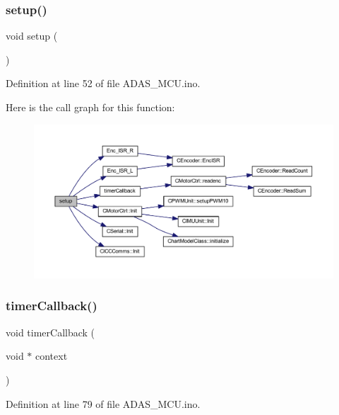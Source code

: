 \subsubsection{\texorpdfstring{setup()}{setup()}}
{\footnotesize\ttfamily void setup (\begin{DoxyParamCaption}{ }\end{DoxyParamCaption})}



Definition at line 52 of file A\+D\+A\+S\+\_\+\+M\+C\+U.\+ino.

Here is the call graph for this function\+:
\nopagebreak
\begin{figure}[H]
\begin{center}
\leavevmode
\includegraphics[width=350pt]{_a_d_a_s___m_c_u_8ino_a4fc01d736fe50cf5b977f755b675f11d_cgraph}
\end{center}
\end{figure}
\mbox{\label{_a_d_a_s___m_c_u_8ino_a9f2f19081d81dba1b47615d1d9363281}} 
\subsubsection{\texorpdfstring{timer\+Callback()}{timerCallback()}}
{\footnotesize\ttfamily void timer\+Callback (\begin{DoxyParamCaption}\item[{void $\ast$}]{context }\end{DoxyParamCaption})}



Definition at line 79 of file A\+D\+A\+S\+\_\+\+M\+C\+U.\+ino.

